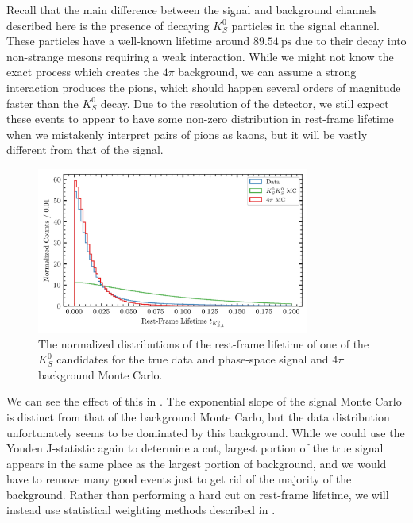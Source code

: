 Recall that the main difference between the signal and background channels described here is the presence of decaying $K_S^0$ particles in the signal channel. These particles have a well-known lifetime around $\SI{89.54}{\pico\second}$ due to their decay into non-strange mesons requiring a weak interaction. While we might not know the exact process which creates the $4\pi$ background, we can assume a strong interaction produces the pions, which should happen several orders of magnitude faster than the $K_S^0$ decay. Due to the resolution of the detector, we still expect these events to appear to have some non-zero distribution in rest-frame lifetime when we mistakenly interpret pairs of pions as kaons, but it will be vastly different from that of the signal.

\begin{figure}
  \begin{center}
    \includegraphics[width=0.8\textwidth]{figures/data_combined_rfl.png}
  \end{center}
  \caption{The normalized distributions of the rest-frame lifetime of one of the $K_S^0$ candidates for the true data and phase-space signal and $4\pi$ background Monte Carlo.}\label{fig:data-combined-rfl}
\end{figure}

We can see the effect of this in . The exponential slope of the signal Monte Carlo is distinct from that of the background Monte Carlo, but the data distribution unfortunately seems to be dominated by this background. While we could use the Youden J-statistic again to determine a cut, largest portion of the true signal appears in the same place as the largest portion of background, and we would have to remove many good events just to get rid of the majority of the background. Rather than performing a hard cut on rest-frame lifetime, we will instead use statistical weighting methods described in .

